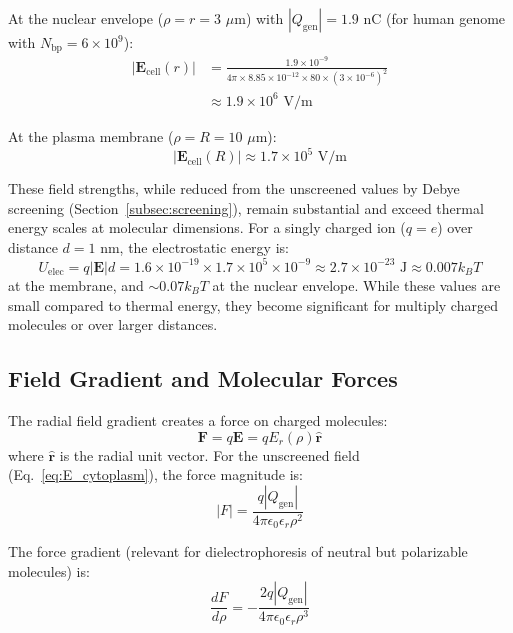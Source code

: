 \documentclass[twocolumn,10pt,aps,prd,superscriptaddress,floatfix,nofootinbib]{revtex4-2}
\theoremstyle{remark}
\begin{document}
At the nuclear envelope ($\rho = r = 3$ $\mu$m) with $|Q_{\mathrm{gen}}| = 1.9$ nC (for human genome with $N_{\mathrm{bp}} = 6 \times 10^9$):
\begin{align}
|\mathbf{E}_{\mathrm{cell}}(r)| &= \frac{1.9 \times 10^{-9}}{4\pi \times 8.85 \times 10^{-12} \times 80 \times (3 \times 10^{-6})^2} \nonumber \\
&\approx 1.9 \times 10^{6} \text{ V/m}
\end{align}

At the plasma membrane ($\rho = R = 10$ $\mu$m):
\begin{equation}
|\mathbf{E}_{\mathrm{cell}}(R)| \approx 1.7 \times 10^{5} \text{ V/m}
\end{equation}

These field strengths, while reduced from the unscreened values by Debye screening (Section~\ref{subsec:screening}), remain substantial and exceed thermal energy scales at molecular dimensions. For a singly charged ion ($q = e$) over distance $d = 1$ nm, the electrostatic energy is:
\begin{equation}
U_{\mathrm{elec}} = q|\mathbf{E}|d = 1.6 \times 10^{-19} \times 1.7 \times 10^{5} \times 10^{-9} \approx 2.7 \times 10^{-23} \text{ J} \approx 0.007 k_B T
\end{equation}
at the membrane, and $\sim 0.07 k_B T$ at the nuclear envelope. While these values are small compared to thermal energy, they become significant for multiply charged molecules or over larger distances.

\subsection{Field Gradient and Molecular Forces}

The radial field gradient creates a force on charged molecules:
\begin{equation}
\mathbf{F} = q\mathbf{E} = q E_r(\rho) \hat{\mathbf{r}}
\label{eq:electrostatic_force}
\end{equation}
where $\hat{\mathbf{r}}$ is the radial unit vector. For the unscreened field (Eq.~\ref{eq:E_cytoplasm}), the force magnitude is:
\begin{equation}
|F| = \frac{q|Q_{\mathrm{gen}}|}{4\pi\epsilon_0\epsilon_r\rho^2}
\end{equation}

The force gradient (relevant for dielectrophoresis of neutral but polarizable molecules) is:
\begin{equation}
\frac{dF}{d\rho} = -\frac{2q|Q_{\mathrm{gen}}|}{4\pi\epsilon_0\epsilon_r\rho^3}
\label{eq:force_gradient}
\end{equation}
\end{document}
